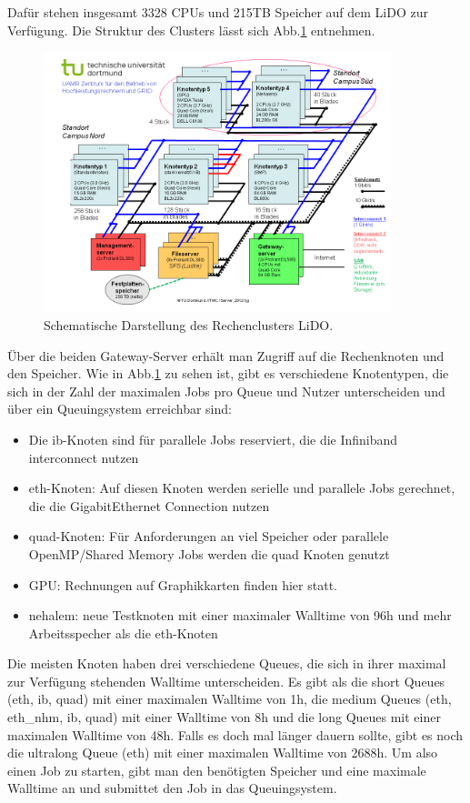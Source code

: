 Dafür stehen insgesamt 3328 CPUs und 215TB Speicher auf dem LiDO zur Verfügung.
Die Struktur des Clusters lässt sich Abb.\ref{LiDo} entnehmen.

\begin{figure}[!h]
    \centering
    \includegraphics[width=0.9\textwidth]{./Plots/LiDO.png}
    \caption{Schematische Darstellung des Rechenclusters LiDO.}
    \label{LiDo}
\end{figure}


Über die beiden Gateway-Server erhält man Zugriff auf die Rechenknoten und den Speicher.
Wie in Abb.\ref{LiDo} zu sehen ist, gibt es verschiedene Knotentypen, die sich in der Zahl der maximalen Jobs pro Queue und Nutzer unterscheiden und über ein Queuingsystem erreichbar sind:

\begin{itemize}
 \item Die ib-Knoten sind für parallele Jobs reserviert, die die Infiniband interconnect nutzen
 \item eth-Knoten: Auf diesen Knoten werden serielle und parallele Jobs gerechnet, die die GigabitEthernet Connection nutzen
 \item quad-Knoten: Für Anforderungen an viel Speicher oder parallele OpenMP/Shared Memory Jobs werden die quad Knoten genutzt
 \item GPU: Rechnungen auf Graphikkarten finden hier statt.
 \item nehalem: neue Testknoten mit einer maximaler Walltime von 96h und mehr Arbeitsspecher als die eth-Knoten
\end{itemize}

Die meisten Knoten haben drei verschiedene Queues, die sich in ihrer maximal zur Verfügung stehenden Walltime unterscheiden.
Es gibt als die short Queues (eth, ib, quad) mit einer maximalen Walltime von 1h, die medium Queues (eth, eth\_nhm, ib, quad) mit einer Walltime von 8h und die long Queues mit einer maximalen Walltime von 48h. 
Falls es doch mal länger dauern sollte, gibt es noch die ultralong Queue (eth) mit einer maximalen Walltime von 2688h.
Um also einen Job zu starten, gibt man den benötigten Speicher und eine maximale Walltime an und submittet den Job in das Queuingsystem.

